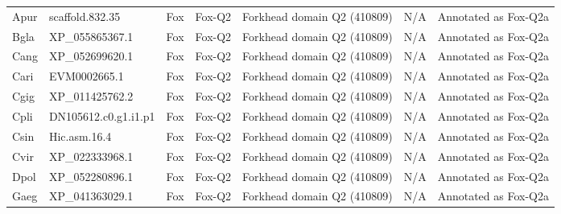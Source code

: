 \documentclass[../main.tex]{subfiles}
\begin{document}
\begin{landscape}
\begin{longtable}{lllllll}
		Apur           & scaffold.832.35       & Fox            & Fox-Q2              & Forkhead domain Q2 (410809)                 & N/A                                                                    & Annotated as Fox-Q2a \\
		Bgla           & XP\_055865367.1       & Fox            & Fox-Q2              & Forkhead domain Q2 (410809)                 & N/A                                                                    & Annotated as Fox-Q2a \\
		Cang           & XP\_052699620.1       & Fox            & Fox-Q2              & Forkhead domain Q2 (410809)                 & N/A                                                                    & Annotated as Fox-Q2a \\
		Cari           & EVM0002665.1          & Fox            & Fox-Q2              & Forkhead domain Q2 (410809)                 & N/A                                                                    & Annotated as Fox-Q2a \\
		Cgig           & XP\_011425762.2       & Fox            & Fox-Q2              & Forkhead domain Q2 (410809)                 & N/A                                                                    & Annotated as Fox-Q2a \\
		Cpli           & DN105612.c0.g1.i1.p1  & Fox            & Fox-Q2              & Forkhead domain Q2 (410809)                 & N/A                                                                    & Annotated as Fox-Q2a \\
		Csin           & Hic.asm.16.4          & Fox            & Fox-Q2              & Forkhead domain Q2 (410809)                 & N/A                                                                    & Annotated as Fox-Q2a \\
		Cvir           & XP\_022333968.1       & Fox            & Fox-Q2              & Forkhead domain Q2 (410809)                 & N/A                                                                    & Annotated as Fox-Q2a \\
		Dpol           & XP\_052280896.1       & Fox            & Fox-Q2              & Forkhead domain Q2 (410809)                 & N/A                                                                    & Annotated as Fox-Q2a \\
		Gaeg           & XP\_041363029.1       & Fox            & Fox-Q2              & Forkhead domain Q2 (410809)                 & N/A                                                                    & Annotated as Fox-Q2a \\

\end{longtable}
\end{landscape}
\end{document}
